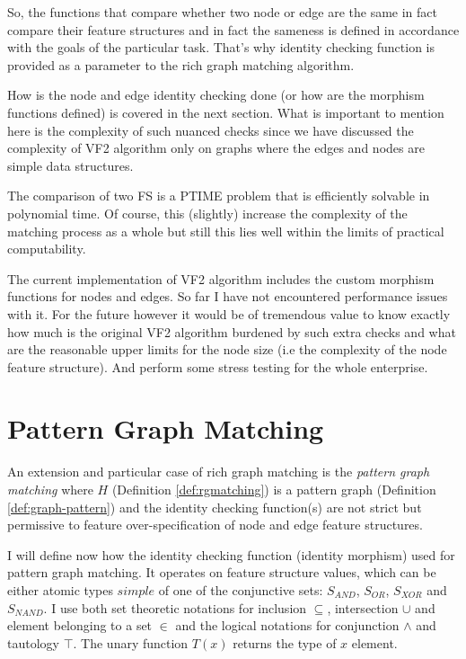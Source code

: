 
So, the functions that compare whether two node or edge are the same in fact compare their feature structures and in fact the sameness is defined in accordance with the goals of the particular task. That's why identity checking function is provided as a parameter to the rich graph matching algorithm.

How is the node and edge identity checking done (or how are the morphism functions defined) is covered in the next section. What is important to mention here is the complexity of such nuanced checks since we have discussed the complexity of VF2 algorithm only on graphs where the edges and nodes are simple data structures. 

The comparison of two FS is a PTIME problem that is efficiently solvable in polynomial time. Of course, this (slightly) increase the complexity of the matching process as a whole but still this lies well within the limits of practical computability. 

The current implementation of VF2 algorithm includes the custom morphism functions for nodes and edges. So far I have not encountered performance issues with it. For the future however it would be of tremendous value to know exactly how much is the original VF2 algorithm burdened by such extra checks and what are the reasonable upper limits for the node size (i.e the complexity of the node feature structure). And perform some stress testing for the whole enterprise.  


\section{Pattern Graph Matching}
\label{sec:pattern-graph-matching}
An extension and particular case of rich graph matching is the \textit{pattern graph matching} where $H$ (Definition \ref{def:rgmatching}) is a pattern graph (Definition \ref{def:graph-pattern}) and the identity checking function(s) are not strict but permissive to feature over-specification of node and edge feature structures. 

I will define now how the identity checking function (identity morphism) used for pattern graph matching. It operates on feature structure values, which can be either atomic types $simple$ of one of the conjunctive sets: $S_{AND}$, $S_{OR}$, $S_{XOR}$ and $S_{NAND}$. I use both set theoretic notations for inclusion $\subseteq$, intersection $\cup$ and element belonging to a set $\in$ and the logical notations for conjunction $\wedge$ and tautology $\top$. The unary function $T(x)$ returns the type of $x$ element. 


